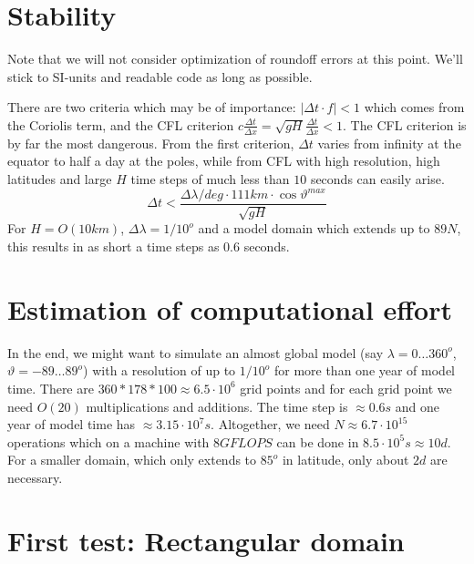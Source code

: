\documentclass[a4paper]{article}
\begin{document}

\section{Stability}

Note that we will not consider optimization of roundoff errors at this point. We'll stick
to SI-units and readable code as long as possible.

There are two criteria which may be of importance: $|\Delta t\cdot f|<1$ which comes from the
Coriolis term, and the CFL criterion $c\frac{\Delta t}{\Delta x}=\sqrt{gH}\frac{\Delta t}{\Delta x}<1$. The CFL
criterion is by far the most dangerous. From the first criterion, $\Delta t$ varies from infinity
at the equator to half a day at the poles, while from CFL with high resolution, high latitudes and 
large $H$ time steps of much less than $10$ seconds can easily arise.
\begin{equation}
  \Delta t < \frac{\Delta\lambda/deg \cdot 111km \cdot \cos\vartheta^{max}}{\sqrt{gH}} 
\end{equation}
For $H=O(10km)$, $\Delta\lambda=1/10^{o}$ and a model domain which extends up to $89N$, this results in 
as short a time steps as $0.6$ seconds.


\section{Estimation of computational effort}

In the end, we might want to simulate an almost global model 
(say $\lambda=0\ldots360^o$, $\vartheta=-89\ldots89^o$) with a resolution 
of up to $1/10^o$ for more than one year of model time. There are 
$360*178*100\approx 6.5\cdot10^6$ grid points and for each grid point we need $O(20)$ 
multiplications and additions. The time step is $\approx 0.6s$ and one year of model time
has $\approx 3.15\cdot 10^7s$. Altogether, we need $N\approx 6.7\cdot 10^{15}$ operations which
on a machine with $8GFLOPS$ can be done in $8.5\cdot 10^5s\approx 10d$. For a smaller domain, which
only extends to $85^o$ in latitude, only about $2d$ are necessary.


\section{First test: Rectangular domain}
\end{document}
